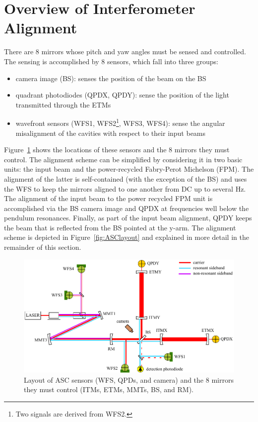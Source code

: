 \section{Overview of Interferometer Alignment}
\label{sec:alignment_overview}

There are 8 mirrors whose pitch and yaw angles must be sensed and controlled. The sensing is accomplished by 8 sensors, which fall into three groups:
\begin{itemize}
\item camera image (BS): senses the position of the beam on the BS \vspace{-10pt}
\item quadrant photodiodes (QPDX, QPDY): sense the position of the light transmitted through the ETMs \vspace{-10pt}
\item wavefront sensors (WFS1, WFS2\footnote{Two signals are derived from WFS2.}, WFS3, WFS4): sense the angular misalignment of the cavities with respect to their input beams
\end{itemize}
Figure~\ref{fig:ASCsensors} shows the locations of these sensors and the 8 mirrors they must control. The alignment scheme can be simplified by considering it in two basic units: the input beam and the power-recycled Fabry-Perot Michelson (FPM). The alignment of the latter is self-contained (with the exception of the BS) and uses the WFS to keep the mirrors aligned to one another from DC up to several Hz. The alignment of the input beam to the power recycled FPM unit is accomplished via the BS camera image and QPDX at frequencies well below the pendulum resonances. Finally, as part of the input beam alignment, QPDY keeps the beam that is reflected from the BS pointed at the y-arm. The alignment scheme is depicted in Figure~\ref{fig:ASClayout} and explained in more detail in the remainder of this section.

\begin{figure} 
\begin{centering} 
\includegraphics{figures/ASCsensors.pdf} 
\caption[Layout of ASC sensors and the mirrors they must control]{Layout of ASC sensors (WFS, QPDs, and camera) and the 8 mirrors they must control (ITMs, ETMs, MMTs, BS, and RM).}
\label{fig:ASCsensors}
\end{centering}
\end{figure}


